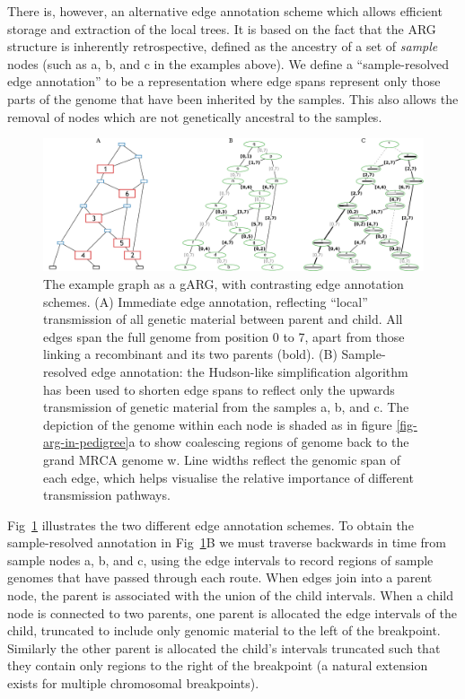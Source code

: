 \documentclass{article}
\begin{document}
There is, however, an alternative edge annotation scheme which allows efficient
storage and extraction of the local trees. It is based on the fact that the ARG
structure is inherently retrospective, defined as the ancestry of a set of \emph{sample}
nodes (such as \textsf{a}, \textsf{b}, and \textsf{c} in the examples above). We define a
``sample-resolved edge annotation'' to be a representation where edge spans
represent only those parts of the genome that have been inherited by the samples.
This also allows the removal of nodes which are not genetically ancestral to the samples.

\begin{figure}
\centering
\includegraphics[width=\textwidth]{illustrations/ancestry-resolution}
\caption{\label{fig-ancestry-resolution}
The \citet[][fig. 1]{wiuf1999recombination} example graph as a gARG, with contrasting
edge annotation schemes.
(A) Immediate edge annotation, reflecting ``local'' transmission of all
genetic material between parent and child. All edges span the full genome from position 0 to 7,
apart from those linking a recombinant and its two parents (bold).
(B) Sample-resolved edge annotation: the Hudson-like simplification algorithm has been used to
shorten edge spans to reflect only the upwards transmission of genetic
material from the samples \textsf{a}, \textsf{b}, and \textsf{c}. The depiction of the genome within
each node is shaded as in figure \ref{fig-arg-in-pedigree}a to show
coalescing regions of genome back to the grand MRCA genome \textsf{w}.
Line widths reflect the genomic span of each edge, which
helps visualise the relative importance of different transmission pathways.
}
\end{figure}

Fig~\ref{fig-ancestry-resolution} illustrates the two different edge annotation
schemes. To obtain the sample-resolved annotation in
Fig~\ref{fig-ancestry-resolution}B we must traverse backwards in time from
sample nodes \textsf{a}, \textsf{b}, and \textsf{c}, using the edge intervals
to record regions of sample genomes that have passed through each route. When
edges join into a parent node, the parent is associated with the union of the
child intervals. When a child node is connected to two parents, one parent is
allocated the edge intervals of the child, truncated to include only genomic
material to the left of the breakpoint. Similarly the other parent is allocated
the child's intervals truncated such that they contain only regions to the
right of the breakpoint (a natural extension exists for multiple chromosomal
breakpoints).
\end{document}
